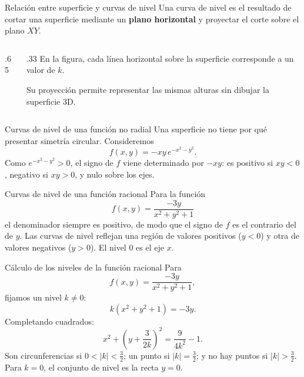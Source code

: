 \documentclass[main.tex]{subfiles}
\begin{document}
\begin{frame}{Relación entre superficie y curvas de nivel}
Una curva de nivel es el resultado de cortar una superficie mediante un \textbf{plano horizontal} y proyectar el corte sobre el plano $XY$.
\begin{columns}[c]
\begin{column}{.65\textwidth}
\end{column}
\begin{column}{.33\textwidth}
\small
En la figura, cada línea horizontal sobre la superficie corresponde a un valor de $k$.
\medskip

Su proyección permite representar las mismas alturas sin dibujar la superficie 3D.
\end{column}
\end{columns}
\end{frame}
\begin{frame}{Curvas de nivel de una función no radial}
Una superficie no tiene por qué presentar simetría circular. Consideremos
\[
f(x,y)=-xy\,e^{-x^2-y^2}.
\]
\vspace{-1mm}
\vspace{-3mm}
\small Como $e^{-x^2-y^2}>0$, el signo de $f$ viene determinado por $-xy$: es positivo si $xy<0$, negativo si $xy>0$, y nulo sobre los ejes.
\end{frame}
\begin{frame}{Curvas de nivel de una función racional}
Para la función
\[
f(x,y)=\frac{-3y}{x^2+y^2+1}
\]
el denominador siempre es positivo, de modo que el signo de $f$ es el contrario del de $y$.
\vspace{-2mm}
\vspace{-3mm}
\small Las curvas de nivel reflejan una región de valores positivos ($y<0$) y otra de valores negativos ($y>0$). El nivel $0$ es el eje $x$.
\end{frame}

\begin{frame}{Cálculo de los niveles de la función racional}
Para
\[
f(x,y)=\frac{-3y}{x^2+y^2+1},
\]
fijamos un nivel $k\ne0$:
\[
k(x^2+y^2+1)=-3y.
\]
Completando cuadrados:
\[
\boxed{x^2+\left(y+\frac{3}{2k}\right)^2
=\frac{9}{4k^2}-1.}
\]
\smallskip
\small
Son circunferencias si $0<|k|<\frac32$; un punto si $|k|=\frac32$;
y no hay puntos si $|k|>\frac32$.
Para $k=0$, el conjunto de nivel es la recta $y=0$.
\end{frame}
\end{document}
